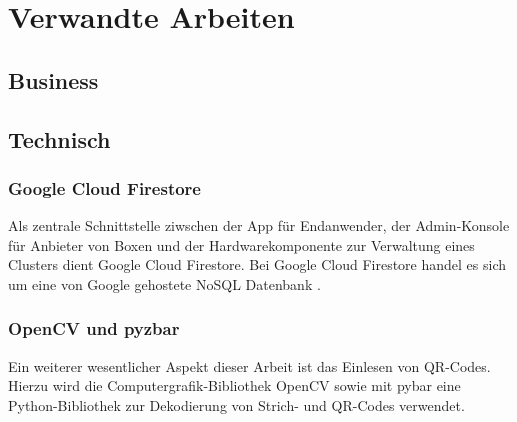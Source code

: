 \documentclass[openright,twoside,a4paper]{scrartcl}
\begin{document}
    \section{Verwandte Arbeiten}
        \subsection{Business}

        \subsection{Technisch}
            \subsubsection{Google Cloud Firestore}
            Als zentrale Schnittstelle ziwschen der App für Endanwender, der Admin-Konsole für Anbieter von Boxen und der Hardwarekomponente zur Verwaltung eines Clusters dient Google Cloud Firestore.
            Bei Google Cloud Firestore handel es sich um eine von Google gehostete NoSQL Datenbank \cite{CloudFirestore}.

        \subsubsection{OpenCV und pyzbar}
            Ein weiterer wesentlicher Aspekt dieser Arbeit ist das Einlesen von QR-Codes. Hierzu wird die Computergrafik-Bibliothek OpenCV sowie mit pybar eine Python-Bibliothek zur Dekodierung von Strich- und QR-Codes verwendet.
\end{document}
